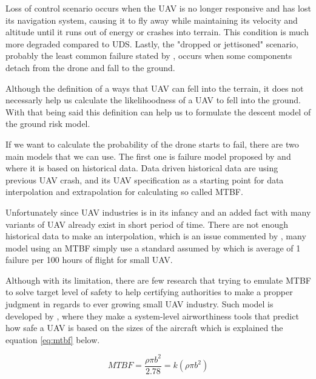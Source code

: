 \documentclass[12pt]{report}
\begin{document}
            Loss of control scenario occurs when the UAV is no longer responsive and has lost its navigation system,
            causing it to fly away while maintaining its velocity and altitude until it runs out of energy or crashes
            into terrain. This condition is much more degraded compared to UDS. Lastly, the "dropped or jettisoned"
            scenario, probably the least common failure stated by \cite{washington_review_2017}, occurs when some
            components detach from the drone and fall to the ground.

            Although the definition of a ways that UAV can fell into the terrain, it does not necessarly help us
            calculate the likelihoodness of a UAV to fell into the ground. With that being said this definition can help
            us to formulate the descent model of the ground risk model.
            
            If we want to calculate the probability of the drone starts to fail, there are two main models that we can
            use. The first one is  failure model proposed by \cite{breunig_modeling_2018} and \cite{weibel_safety_2012}
            where it is based on historical data. Data driven historical data are using previous UAV crash, and its UAV
            specification as a starting point for data interpolation and extrapolation for calculating so called
            \ac{MTBF}.

            Unfortunately since UAV industries is in its infancy and an added fact with many variants of UAV already
            exist in short period of time. There are not enough historical data to make an interpolation, which is an
            issue commented by \cite{breunig_modeling_2018}, many model using an MTBF simply use a standard assumed by
            \cite{arc_unmanned_2015} which is average of 1 failure per 100 hours of flight for small UAV.

            Although with its limitation, there are few research that trying to emulate MTBF to solve target level of
            safety to help certifying authorities to make a propper judgment in regards to ever growing small UAV
            industry. Such model is developed by \cite{burke_system-level_2011}, where they make a system-level
            airworthiness tools that predict how safe a UAV is based on the sizes of the aircraft which is explained the
            equation \ref{eq:mtbf} below.

            \begin{equation}\label{eq:mtbf}
                MTBF = \frac{\rho \pi b^2}{2.78} = k(\rho \pi b^2)
            \end{equation}
\end{document}
